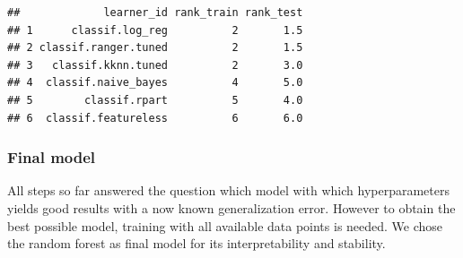 \documentclass[
]{article}
\newenvironment{Shaded}{\begin{snugshade}}{\end{snugshade}}
\newcommand{\CommentTok}[1]{\textcolor[rgb]{0.56,0.35,0.01}{\textit{#1}}}
\newcommand{\DataTypeTok}[1]{\textcolor[rgb]{0.13,0.29,0.53}{#1}}
\newcommand{\KeywordTok}[1]{\textcolor[rgb]{0.13,0.29,0.53}{\textbf{#1}}}
\newcommand{\NormalTok}[1]{#1}
\newcommand{\OperatorTok}[1]{\textcolor[rgb]{0.81,0.36,0.00}{\textbf{#1}}}
\newcommand{\StringTok}[1]{\textcolor[rgb]{0.31,0.60,0.02}{#1}}
\begin{document}
\begin{Shaded}
\end{Shaded}

\begin{verbatim}
##             learner_id rank_train rank_test
## 1      classif.log_reg          2       1.5
## 2 classif.ranger.tuned          2       1.5
## 3   classif.kknn.tuned          2       3.0
## 4  classif.naive_bayes          4       5.0
## 5        classif.rpart          5       4.0
## 6  classif.featureless          6       6.0
\end{verbatim}

\hypertarget{final-model}{%
\subsubsection{Final model}\label{final-model}}

All steps so far answered the question which model with which
hyperparameters yields good results with a now known generalization
error. However to obtain the best possible model, training with all
available data points is needed. We chose the random forest as final
model for its interpretability and stability.
\end{document}
